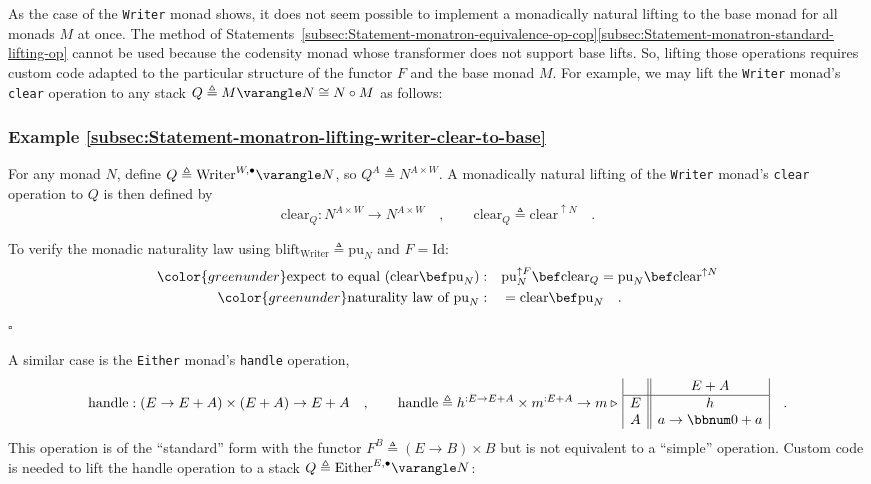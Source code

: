 As the case of the \lstinline!Writer! monad shows, it does not seem
possible to implement a monadically natural lifting to the base monad
for all monads $M$ at once. The method of Statements~\ref{subsec:Statement-monatron-equivalence-op-cop}\textendash \ref{subsec:Statement-monatron-standard-lifting-op}
cannot be used because the codensity monad whose transformer does
not support base lifts. So, lifting those operations requires custom
code adapted to the particular structure of the functor $F$ and the
base monad $M$. For example, we may lift the \lstinline!Writer!
monad\textsf{'}s \lstinline!clear! operation to any stack $Q\triangleq M\varangle N\cong N\circ M$
as follows:

\subsubsection{Example \label{subsec:Statement-monatron-lifting-writer-clear-to-base}\ref{subsec:Statement-monatron-lifting-writer-clear-to-base}}

For any monad $N$, define $Q\triangleq\text{Writer}^{W,\bullet}\varangle N$,
so $Q^{A}\triangleq N^{A\times W}$. A monadically natural lifting
of the \lstinline!Writer! monad\textsf{'}s \lstinline!clear! operation to
$Q$ is then defined by
\[
\text{clear}_{Q}:N^{A\times W}\rightarrow N^{A\times W}\quad,\quad\quad\text{clear}_{Q}\triangleq\text{clear}^{\uparrow N}\quad.
\]

To verify the monadic naturality law using $\text{blift}_{\text{Writer}}\triangleq\text{pu}_{N}$
and $F=\text{Id}$:
\begin{align*}
{\color{greenunder}\text{expect to equal }(\text{clear}\bef\text{pu}_{N}):}\quad & \text{pu}_{N}^{\uparrow F}\bef\text{clear}_{Q}=\text{pu}_{N}\bef\text{clear}^{\uparrow N}\\
{\color{greenunder}\text{naturality law of }\text{pu}_{N}:}\quad & =\text{clear}\bef\text{pu}_{N}\quad.
\end{align*}
$\square$

A similar case is the \lstinline!Either! monad\textsf{'}s \lstinline!handle!
operation,
\[
\text{handle}:\left(E\rightarrow E+A\right)\times\left(E+A\right)\rightarrow E+A\quad,\quad\quad\text{handle}\triangleq h^{:E\rightarrow E+A}\times m^{:E+A}\rightarrow m\triangleright\,\begin{array}{|c||c|}
 & E+A\\
\hline E & h\\
A & a\rightarrow\bbnum 0+a
\end{array}\quad.
\]
This operation is of the \textsf{``}standard\textsf{''} form with the functor $F^{B}\triangleq\left(E\rightarrow B\right)\times B$
but is not equivalent to a \textsf{``}simple\textsf{''} operation. Custom code is
needed to lift the handle operation to a stack $Q\triangleq\text{Either}^{E,\bullet}\varangle N$:

